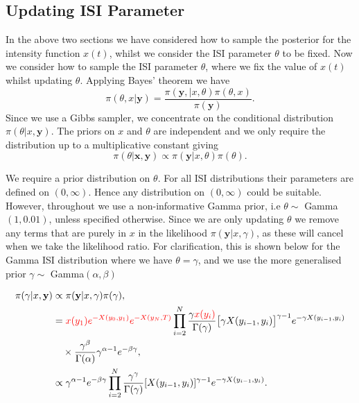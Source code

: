 \documentclass[../main.tex]{subfiles}
\begin{document}
\subsection{Updating ISI Parameter}
In the above two sections we have considered how to sample the posterior for the intensity function $x(t)$, whilst we consider the ISI parameter $\theta$ to be fixed. Now we consider how to sample the ISI parameter $\theta$, where we fix the value of $x(t)$ whilst updating $\theta$. Applying Bayes' theorem we have
\begin{equation}
 \pi (\theta , x| \mathbf{y} )  =  \frac{\pi(\mathbf{y},| x,  \theta) \pi (\theta , x) }{\pi(\mathbf{y})}.
\end{equation}
Since we use a Gibbs sampler, we concentrate on the conditional distribution $\pi (\theta | x, \mathbf{y})$. The priors on $x$ and $\theta$ are independent and we only require the distribution up to a multiplicative constant giving
\begin{equation}
 \pi (\theta | \mathbf{x}, \mathbf{y} )  \propto  \pi(\mathbf{y}| x,  \theta) \pi (\theta).
 \end{equation}

We require a prior distribution on $\theta$. For all ISI distributions their parameters are defined on $(0,\infty)$. Hence any distribution on   $(0,\infty)$ could be suitable. However, throughout we use a non-informative Gamma prior, i.e $\theta \sim$ Gamma$(1,0.01)$, unless specified otherwise. 
Since we are only updating $\theta$ we remove any terms that are purely in $x$ in the likelihood $\pi (\mathbf{y} | x, \gamma)$, as these will cancel when we take the likelihood ratio. For clarification, this is shown below for the Gamma ISI distribution where we have $\theta = \gamma$, and we use the more generalised prior $\gamma \sim$ Gamma$(\alpha,\beta)$    
   
\begin{align}
 \pi (\gamma |x, \mathbf{y} ) & \propto \pi (\mathbf{y} | x, \gamma) \pi (\gamma), \\
 & = { \color{red} x(y_1) e^{-X(y_0,y_1)} e^{-X(y_N,T)} }\prod^N_{i=2}  \frac{\gamma {\color{red}x(y_i)}}{\Gamma ( \gamma )} \big[ \gamma X(y_{i-1} , y_i ) \big]^{\gamma -1} e^{- \gamma X(y_{i-1} , y_i ) } \nonumber \\
 & \quad \times \frac{\gamma^\beta}{\Gamma(\alpha)} \gamma^{\alpha -1} e^{-\beta \gamma}, \\
 & \propto \gamma^{\alpha-1} e^{-\beta \gamma}
  \prod_{i=2}^N  \frac{\gamma^\gamma }{\Gamma ( \gamma )} [  X(y_{i-1} , y_i )  ]^{\gamma -1} e^{- \gamma X(y_{i-1} , y_i ) }. 
 \end{align}
 
\end{document}
